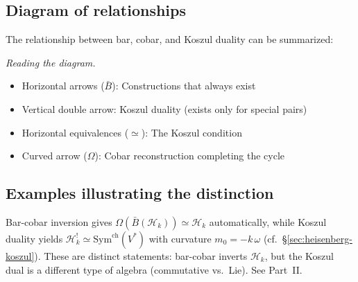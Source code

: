 \subsection{Diagram of relationships}

The relationship between bar, cobar, and Koszul duality can be summarized:

\begin{center}
\end{center}

\emph{Reading the diagram.}
\begin{itemize}
\item Horizontal arrows ($\bar{B}$): Constructions that always exist
\item Vertical double arrow: Koszul duality (exists only for special pairs)
\item Horizontal equivalences ($\simeq$): The Koszul condition
\item Curved arrow ($\Omega$): Cobar reconstruction completing the cycle
\end{itemize}

\subsection{Examples illustrating the distinction}

\begin{example}\label{ex:heisenberg-koszul-vs-barcobar}
Bar-cobar inversion gives $\Omega(\bar{B}(\mathcal{H}_k)) \simeq \mathcal{H}_k$ automatically, while Koszul duality yields $\mathcal{H}_k^! \simeq \mathrm{Sym}^{\mathrm{ch}}(V^*)$ with curvature $m_0 = -k\,\omega$ (cf.\ \S\ref{sec:heisenberg-koszul}).  These are distinct statements: bar-cobar inverts $\mathcal{H}_k$, but the Koszul dual is a different type of algebra (commutative vs.\ Lie).  See Part~II.
\end{example}

